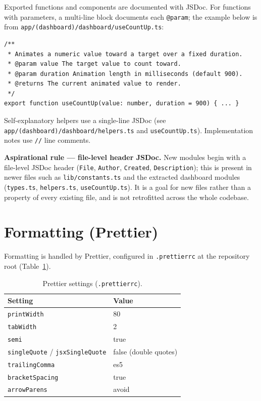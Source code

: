 \documentclass[11pt]{article}
\begin{document}
Exported functions and components are documented with JSDoc. For functions
with parameters, a multi-line block documents each \texttt{@param}; the example
below is from \texttt{app/(dashboard)/dashboard/useCountUp.ts}:

\begin{verbatim}
/**
 * Animates a numeric value toward a target over a fixed duration.
 * @param value The target value to count toward.
 * @param duration Animation length in milliseconds (default 900).
 * @returns The current animated value to render.
 */
export function useCountUp(value: number, duration = 900) { ... }
\end{verbatim}

Self-explanatory helpers use a single-line JSDoc (see
\texttt{app/(dashboard)/dashboard/helpers.ts} and \texttt{useCountUp.ts}).
Implementation notes use \texttt{//} line comments.

\textbf{Aspirational rule --- file-level header JSDoc.} New modules begin with
a file-level JSDoc header (\texttt{File}, \texttt{Author}, \texttt{Created},
\texttt{Description}); this is present in newer files such as
\texttt{lib/constants.ts} and the extracted dashboard modules
(\texttt{types.ts}, \texttt{helpers.ts}, \texttt{useCountUp.ts}). It is a goal for new files rather than a property of
every existing file, and is not retrofitted across the whole codebase.

\section{Formatting (Prettier)}

Formatting is handled by Prettier, configured in \texttt{.prettierrc} at the
repository root (Table~\ref{tab:prettier}).

\begin{table}[H]
\centering
\caption{Prettier settings (\texttt{.prettierrc}).}
\label{tab:prettier}
\begin{tabular}{p{4.5cm} p{4.5cm}}
\toprule
Setting & Value \\
\midrule
\texttt{printWidth} & 80 \\
\texttt{tabWidth} & 2 \\
\texttt{semi} & true \\
\texttt{singleQuote} / \texttt{jsxSingleQuote} & false (double quotes) \\
\texttt{trailingComma} & es5 \\
\texttt{bracketSpacing} & true \\
\texttt{arrowParens} & avoid \\
\bottomrule
\end{tabular}
\end{table}
\end{document}
